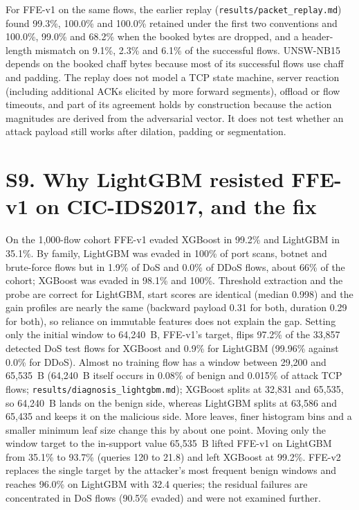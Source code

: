 \begin{table}[!htbp]
\centering
\caption*{Table S15. Share (\%) of FFE-v2's schema-level evasions that remain evasive after packet-level replay (XGBoost).}
\footnotesize

\end{table}

For FFE-v1 on the same flows, the earlier replay (\texttt{results/packet\_replay.md}) found 99.3\%, 100.0\% and 100.0\% retained under the first two conventions and 100.0\%, 99.0\% and 68.2\% when the booked bytes are dropped, and a header-length mismatch on 9.1\%, 2.3\% and 6.1\% of the successful flows. UNSW-NB15 depends on the booked chaff bytes because most of its successful flows use chaff and padding. The replay does not model a TCP state machine, server reaction (including additional ACKs elicited by more forward segments), offload or flow timeouts, and part of its agreement holds by construction because the action magnitudes are derived from the adversarial vector. It does not test whether an attack payload still works after dilation, padding or segmentation.

\section*{S9. Why LightGBM resisted FFE-v1 on CIC-IDS2017, and the fix}

On the 1,000-flow cohort FFE-v1 evaded XGBoost in 99.2\% and LightGBM in 35.1\%. By family, LightGBM was evaded in 100\% of port scans, botnet and brute-force flows but in 1.9\% of DoS and 0.0\% of DDoS flows, about 66\% of the cohort; XGBoost was evaded in 98.1\% and 100\%. Threshold extraction and the probe are correct for LightGBM, start scores are identical (median 0.998) and the gain profiles are nearly the same (backward payload 0.31 for both, duration 0.29 for both), so reliance on immutable features does not explain the gap. Setting only the initial window to 64,240~B, FFE-v1's target, flips 97.2\% of the 33,857 detected DoS test flows for XGBoost and 0.9\% for LightGBM (99.96\% against 0.0\% for DDoS). Almost no training flow has a window between 29,200 and 65,535~B (64,240~B itself occurs in 0.08\% of benign and 0.015\% of attack TCP flows; \texttt{results/diagnosis\_lightgbm.md}); XGBoost splits at 32,831 and 65,535, so 64,240~B lands on the benign side, whereas LightGBM splits at 63,586 and 65,435 and keeps it on the malicious side. More leaves, finer histogram bins and a smaller minimum leaf size change this by about one point. Moving only the window target to the in-support value 65,535~B lifted FFE-v1 on LightGBM from 35.1\% to 93.7\% (queries 120 to 21.8) and left XGBoost at 99.2\%. FFE-v2 replaces the single target by the attacker's most frequent benign windows and reaches 96.0\% on LightGBM with 32.4 queries; the residual failures are concentrated in DoS flows (90.5\% evaded) and were not examined further.

